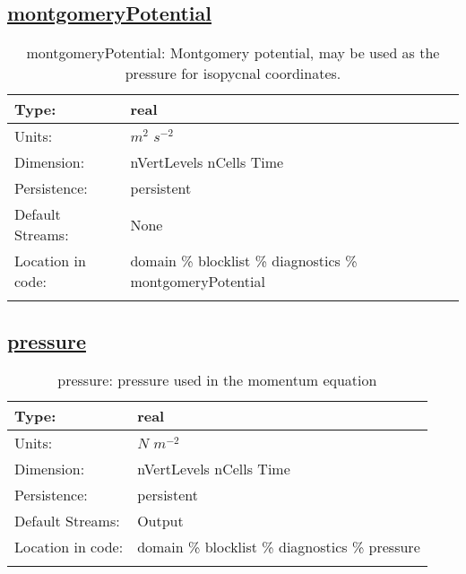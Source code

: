 \subsection[montgomeryPotential]{\hyperref[sec:var_tab_diagnostics]{montgomeryPotential}}
\label{subsec:var_sec_diagnostics_montgomeryPotential}
\begin{center}
\begin{longtable}{| p{2.0in} | p{4.0in} |}
        \hline 
        Type: & real \\
        \hline 
        Units: & $m^2$ $s^{-2}$ \\
        \hline 
        Dimension: & nVertLevels nCells Time \\
        \hline 
        Persistence: & persistent \\
        \hline 
		 Default Streams: & None \\
        \hline 
		 Location in code: & domain \% blocklist \% diagnostics \% montgomeryPotential \\
		 \hline 
    \caption{montgomeryPotential: Montgomery potential, may be used as the pressure for isopycnal coordinates.}
\end{longtable}
\end{center}
\subsection[pressure]{\hyperref[sec:var_tab_diagnostics]{pressure}}
\label{subsec:var_sec_diagnostics_pressure}
\begin{center}
\begin{longtable}{| p{2.0in} | p{4.0in} |}
        \hline 
        Type: & real \\
        \hline 
        Units: & $N$ $m^{-2}$ \\
        \hline 
        Dimension: & nVertLevels nCells Time \\
        \hline 
        Persistence: & persistent \\
        \hline 
		 Default Streams: & Output  \\
        \hline 
		 Location in code: & domain \% blocklist \% diagnostics \% pressure \\
		 \hline 
    \caption{pressure: pressure used in the momentum equation}
\end{longtable}
\end{center}
